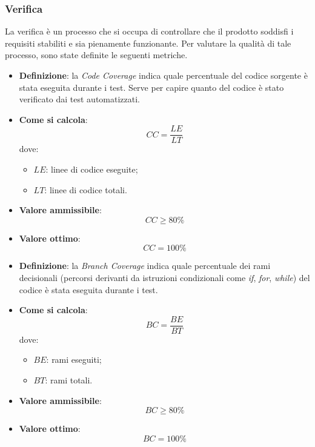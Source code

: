 \subsubsection{Verifica}
La verifica è un processo che si occupa di controllare che il prodotto soddisfi i requisiti stabiliti
e sia pienamente funzionante. Per valutare la qualità di tale processo, sono state definite le seguenti metriche.

\hypertarget{26M}{}
\begin{itemize}
	\item \textbf{Definizione}: la \textit{Code Coverage} indica quale percentuale del codice sorgente è stata eseguita durante i test. Serve per capire quanto del codice è stato verificato dai test automatizzati.
	\item \textbf{Come si calcola}: \begin{equation*}CC = \frac{LE}{LT}\end{equation*} dove:
		\begin{itemize}
			\item $LE$: linee di codice eseguite;
			\item $LT$: linee di codice totali.
		\end{itemize}
	\item \textbf{Valore ammissibile}: \begin{equation*}CC \geq 80\%\end{equation*}
	\item \textbf{Valore ottimo}: \begin{equation*}CC = 100\%\end{equation*}
\end{itemize}

\hypertarget{27M}{}
\begin{itemize}
	\item \textbf{Definizione}: la \textit{Branch Coverage} indica quale percentuale dei rami decisionali (percorsi derivanti da istruzioni condizionali come \textit{if}, \textit{for}, \textit{while}) del codice è stata eseguita durante i test.
	\item \textbf{Come si calcola}: \begin{equation*}BC = \frac{BE}{BT}\end{equation*} dove:
		\begin{itemize}
			\item $BE$: rami eseguiti;
			\item $BT$: rami totali.
		\end{itemize}
	\item \textbf{Valore ammissibile}: \begin{equation*}BC \geq 80\%\end{equation*}
	\item \textbf{Valore ottimo}: \begin{equation*}BC = 100\%\end{equation*}
\end{itemize}

